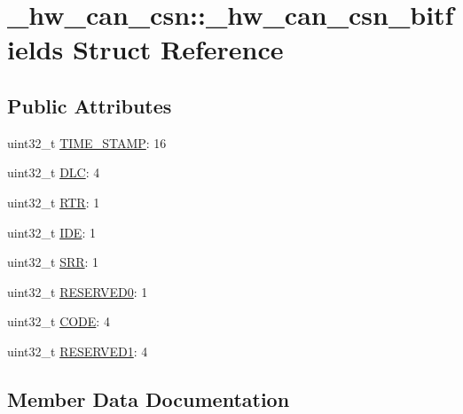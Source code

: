 \hypertarget{struct__hw__can__csn_1_1__hw__can__csn__bitfields}{}\section{\+\_\+hw\+\_\+can\+\_\+csn\+:\+:\+\_\+hw\+\_\+can\+\_\+csn\+\_\+bitfields Struct Reference}
\label{struct__hw__can__csn_1_1__hw__can__csn__bitfields}
\subsection*{Public Attributes}
\begin{DoxyCompactItemize}
\item 
uint32\+\_\+t \hyperlink{struct__hw__can__csn_1_1__hw__can__csn__bitfields_ac32fbe6cd02d09d7cd03b040f9ae8195}{T\+I\+M\+E\+\_\+\+S\+T\+A\+MP}\+: 16
\item 
uint32\+\_\+t \hyperlink{struct__hw__can__csn_1_1__hw__can__csn__bitfields_a3f53bbb3dd0e5074fedee57c1801786e}{D\+LC}\+: 4
\item 
uint32\+\_\+t \hyperlink{struct__hw__can__csn_1_1__hw__can__csn__bitfields_a491cfa45d726cec46bd6de882f406b30}{R\+TR}\+: 1
\item 
uint32\+\_\+t \hyperlink{struct__hw__can__csn_1_1__hw__can__csn__bitfields_af4490f3122308210406e02a16914f04e}{I\+DE}\+: 1
\item 
uint32\+\_\+t \hyperlink{struct__hw__can__csn_1_1__hw__can__csn__bitfields_ac93774a2aba9efab06305b036c5a2cbc}{S\+RR}\+: 1
\item 
uint32\+\_\+t \hyperlink{struct__hw__can__csn_1_1__hw__can__csn__bitfields_a1c6a978e5ff4cceb9be0b84d63b28c08}{R\+E\+S\+E\+R\+V\+E\+D0}\+: 1
\item 
uint32\+\_\+t \hyperlink{struct__hw__can__csn_1_1__hw__can__csn__bitfields_afcd3c496df69655b55fbeee2e2544dfb}{C\+O\+DE}\+: 4
\item 
uint32\+\_\+t \hyperlink{struct__hw__can__csn_1_1__hw__can__csn__bitfields_af29c313de890999b15ebaebeb2d563a3}{R\+E\+S\+E\+R\+V\+E\+D1}\+: 4
\end{DoxyCompactItemize}


\subsection{Member Data Documentation}
